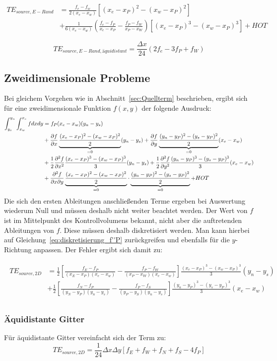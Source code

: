 \begin{align}
  TE_{source, E-Rand} &=
 \frac{f_e-f_w}{2(x_e-x_w)}  \left[{(x_e-x_P)^2-(x_w-x_P)^2}\right]\nonumber\\
&+\frac{1}{6(x_e-x_w)}\left(\frac{f_e-f_P}{x_e-x_P}-\frac{f_P-f_W}{x_P-x_W}\right)
  \left[{{(x_e-x_P)}^3-{(x_w-x_P)}^3}\right] + HOT
\end{align}

\begin{equation*}
  TE_{source, E-Rand, äquidistant} = \frac{\Delta x}{24} \left({2f_e-3f_P+f_W}\right)
\end{equation*}








\subsection{Zweidimensionale Probleme}

Bei gleichem Vorgehen wie in Abschnitt~\ref{sec:Quellterm} beschrieben, ergibt sich für
eine zweidimensionale Funktion $f(x, y)$ der folgende Ausdruck:
\begin{align*}
  \int_{y_s}^{y_n}\int_{x_w}^{x_e} f dx dy &= f_P (x_e-x_w)(y_n-y_s)\\
                                           &+ \frac{\partial f}{\partial x} \underbrace{\frac{(x_e-x_P)^2 - (x_w-x_P)^2}{2}}_{=0} (y_n-y_s)
  + \frac{\partial f}{\partial y} \underbrace{\frac{(y_n-y_P)^2-(y_s-y_P)^2}{2}}_{=0} (x_e-x_w) \\
  &+ \frac{1}{2} \frac{\partial^2 f}{\partial x^2}\frac{(x_e-x_P)^3 - (x_w-x_P)^3}{3} (y_n-y_s)
  + \frac{1}{2} \frac{\partial^2 f}{\partial y^2} \frac{(y_n-y_P)^3-(y_s-y_P)^3}{3} (x_e-x_w) \\
  &+ \frac{\partial^2 f}{\partial x\partial y} \underbrace{\frac{(x_e-x_P)^2 - (x_w-x_P)^2}{2}}_{=0} \cdot
  \underbrace{\frac{(y_n-y_P)^2-(y_s-y_P)^2}{2}}_{=0} + HOT
\end{align*}
Die sich den ersten Ableitungen anschließenden Terme ergeben bei Auswertung wiederum Null
und müssen deshalb nicht weiter beachtet werden.
Der Wert von $f$ ist im Mittelpunkt des Kontrollvolumens bekannt, nicht aber die auftretenden
Ableitungen von $f$. Diese müssen deshalb diskretisiert werden. Man kann hierbei auf
Gleichung~\eqref{eq:diskretisierung_f''P} zurückgreifen und ebenfalls für die $y$-Richtung anpassen.
Der Fehler ergibt sich damit zu:

\begin{align}
  \begin{split}
  TE_{source, 2D} &=                \frac{1}{2}
  \left[{\frac{f_E-f_P}{(x_E-x_P)(x_e-x_w)}-\frac{f_P-f_W}{(x_P-x_W)(x_e-x_w)}  }\right]
  \frac{(x_e-x_P)^3 - (x_w-x_P)^3}{3} (y_n-y_s)\\
  &+ \frac{1}{2}
  \left[{\frac{f_N-f_P}{(y_N-y_P)(y_n-y_s)}-\frac{f_P-f_S}{(y_P-y_S)(y_n-y_s)}  }\right]
  \frac{(y_n-y_P)^3-(y_s-y_P)^3}{3} (x_e-x_w) \\
  \end{split}
\end{align}

\subsubsection{Äquidistante Gitter}

Für äquidistante Gitter vereinfacht sich der Term zu:
\begin{equation}
  TE_{source,2D} = \frac{1}{24} \Delta x \Delta y \left[{f_E+f_W+f_N+f_S - 4f_P}\right]
\end{equation}

